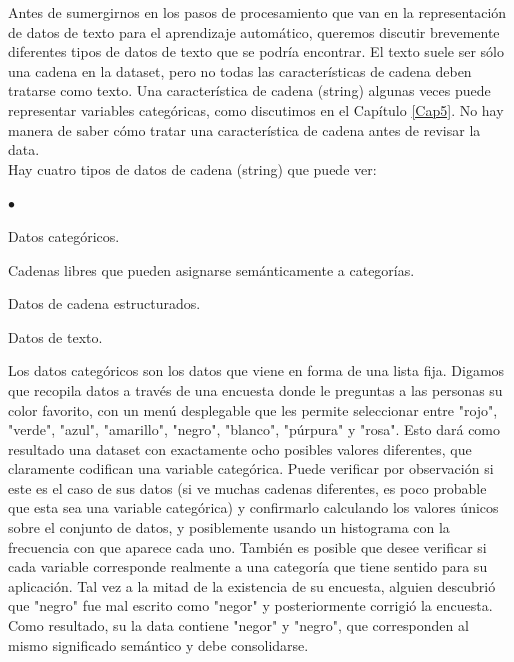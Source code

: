 Antes de sumergirnos en los pasos de procesamiento que van en la representación de datos de texto para el aprendizaje automático, queremos discutir brevemente diferentes tipos de datos de texto que se  podría encontrar. El texto suele ser sólo una cadena en la dataset, pero no todas las características de cadena deben tratarse como texto. Una característica de cadena (string) algunas  veces puede representar variables categóricas, como discutimos en el Capítulo \ref{Cap5}. No hay manera de saber cómo tratar una característica de cadena antes de revisar la data.\\


\noindent Hay cuatro tipos de datos de cadena (string) que puede ver:

\begin{list}{$\bullet$}{}  
	
	\item Datos categóricos.
	
	\item  Cadenas libres que pueden asignarse semánticamente a categorías.
	
	\item   Datos de cadena estructurados.
	
	\item  Datos de texto. 
\end{list}Los datos categóricos son los datos  que viene en forma  de una lista fija. Digamos que recopila datos a través de una encuesta donde le preguntas a las personas su color favorito, con un menú desplegable que les permite  seleccionar entre "{}rojo"{}, "{}verde"{}, "{}azul"{}, "{}amarillo"{}, "{}negro"{}, "{}blanco"{}, "{}púrpura"{} y "{}rosa"{}. 
Esto dará como resultado una dataset con exactamente ocho posibles valores  diferentes, que claramente
codifican una variable categórica. Puede verificar  por  observación  si este es el caso de sus datos
(si ve muchas cadenas diferentes, es poco probable que esta sea una variable categórica) y confirmarlo calculando los valores únicos sobre el conjunto de datos, y posiblemente usando un histograma con  la frecuencia con que aparece cada uno. 
También es posible que desee verificar si cada variable corresponde realmente a una categoría que tiene sentido para su aplicación. Tal vez a la mitad de la existencia de su encuesta, alguien descubrió que
"{}negro"{} fue mal escrito como "{}negor"{} y posteriormente corrigió la encuesta. Como resultado, su
la data contiene "{}negor"{} y "{}negro"{}, que corresponden al mismo 
significado  semántico  y debe consolidarse.\\



